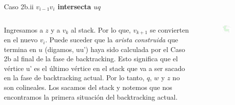 \documentclass[aspectratio=169,xcolor=dvipsnames, t]{beamer}
\begin{document}
\begin{frame}{Caso 2b.ii}
  \textbf{$v_{i-1}v_{i}$ intersecta $uq$}\\
  \vspace{0.2cm}
  \begin{columns}
    \begin{column}{0.45\textwidth}
      \footnotesize
      Ingresamos a $z$ y a $v_{k}$ al stack. Por lo que, $v_{k+1}$ se convierten en el nuevo $v_{i}$. Puede suceder que la \textit{arista construida} que termina en $u$ (digamos, uu’) haya sido calculada por el Caso 2b al final de la fase de backtracking. Esto significa que el vértice u’ es el último vértice en el stack que va a ser sacado en la fase de backtracking actual. Por lo tanto, $q$, $w$ y $z$ no son colineales. Los sacamos del stack y notemos que nos encontramos la primera situación del backtracking actual.\\
      \vspace{0.5cm}
    \end{column}
    \begin{column}{0.45\textwidth}  %
      \vspace{-2cm}
      \begin{figure}
        \centering
        \includegraphics[width=1\textwidth]{imagenes/Caso2.7b.png}
      \end{figure}
    \end{column}
  \end{columns}
\end{frame}
\end{document}
